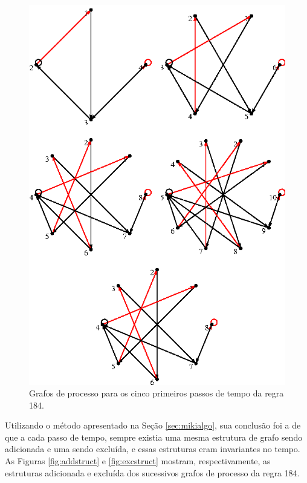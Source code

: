 \documentclass[12pt,a4paper]{article}
\begin{document}
\begin{figure}[htp]
\begin{center}
\includegraphics[scale=1]{img/184_5t.eps}
\caption{Grafos de processo para os cinco primeiros passos de tempo da regra 184.}
\label{fig:184-5t}
\end{center}
\end{figure}

Utilizando o método apresentado na Seção \ref{sec:mikialgo}, sua conclusão
foi a de que a cada passo de tempo, sempre existia uma mesma estrutura
de grafo sendo adicionada e uma sendo excluída, e essas estruturas eram
invariantes no tempo. As Figuras \ref{fig:addstruct} e \ref{fig:excstruct}
mostram, respectivamente, as estruturas adicionada e excluída dos sucessivos
grafos de processo da regra 184.
\end{document}
